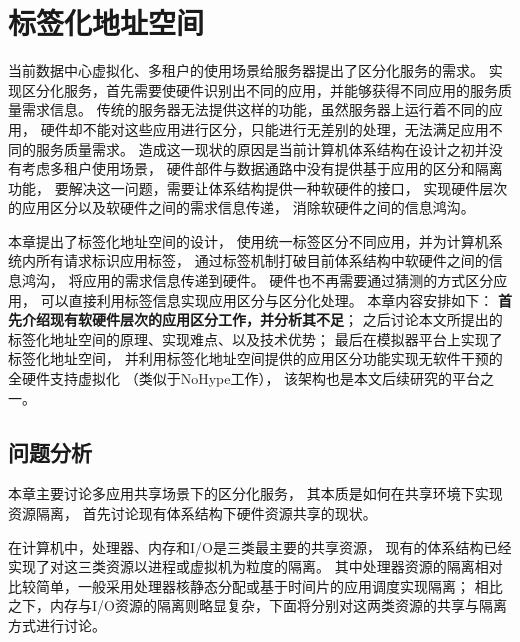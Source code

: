 

\chapter{标签化地址空间}
\label{chap:labeladdrspace}

当前数据中心虚拟化、多租户的使用场景给服务器提出了区分化服务的需求。
实现区分化服务，首先需要使硬件识别出不同的应用，并能够获得不同应用的服务质量需求信息。
传统的服务器无法提供这样的功能，虽然服务器上运行着不同的应用，
硬件却不能对这些应用进行区分，只能进行无差别的处理，无法满足应用不同的服务质量需求。
造成这一现状的原因是当前计算机体系结构在设计之初并没有考虑多租户使用场景，
硬件部件与数据通路中没有提供基于应用的区分和隔离功能，
要解决这一问题，需要让体系结构提供一种软硬件的接口，
实现硬件层次的应用区分以及软硬件之间的需求信息传递，
消除软硬件之间的信息鸿沟。

本章提出了标签化地址空间的设计，
使用统一标签区分不同应用，并为计算机系统内所有请求标识应用标签，
通过标签机制打破目前体系结构中软硬件之间的信息鸿沟，
将应用的需求信息传递到硬件。
硬件也不再需要通过猜测的方式区分应用，
可以直接利用标签信息实现应用区分与区分化处理。
本章内容安排如下：
\textbf{首先介绍现有软硬件层次的应用区分工作，并分析其不足}；
之后讨论本文所提出的标签化地址空间的原理、实现难点、以及技术优势； 
最后在模拟器平台上实现了标签化地址空间，
并利用标签化地址空间提供的应用区分功能实现无软件干预的全硬件支持虚拟化
（类似于NoHype工作\cite{keller_nohype:_2010}），
该架构也是本文后续研究的平台之一。

%
%
% 
%

\section{问题分析}

本章主要讨论多应用共享场景下的区分化服务，
其本质是如何在共享环境下实现资源隔离，
首先讨论现有体系结构下硬件资源共享的现状。

在计算机中，处理器、内存和I/O是三类最主要的共享资源，
现有的体系结构已经实现了对这三类资源以进程或虚拟机为粒度的隔离。
其中处理器资源的隔离相对比较简单，一般采用处理器核静态分配或基于时间片的应用调度实现隔离；
相比之下，内存与I/O资源的隔离则略显复杂，下面将分别对这两类资源的共享与隔离方式进行讨论。

